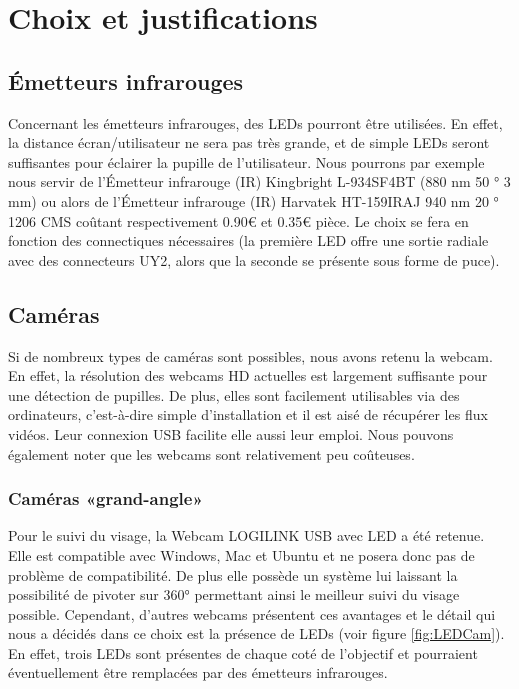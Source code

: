 \chapter{Choix et justifications}

\section{Émetteurs infrarouges}

Concernant les émetteurs infrarouges, des LEDs pourront être utilisées. En effet, la distance écran/utilisateur ne sera pas très grande, et de simple LEDs seront suffisantes pour éclairer la pupille de l'utilisateur. Nous pourrons par exemple nous servir de l’Émetteur infrarouge (IR) Kingbright L-934SF4BT (880 nm 50 ° 3 mm) ou alors de l’Émetteur infrarouge (IR) Harvatek HT-159IRAJ 940 nm 20 ° 1206 CMS coûtant respectivement 0.90€ et 0.35€ pièce. Le choix se fera en fonction des connectiques nécessaires (la première LED offre une sortie radiale avec des connecteurs UY2, alors que la seconde se présente sous forme de puce).

\section{Caméras}

Si de nombreux types de caméras sont possibles, nous avons retenu la webcam. En effet, la résolution des webcams HD actuelles est largement suffisante pour une détection de pupilles. De plus, elles sont facilement utilisables via des ordinateurs, c'est-à-dire simple d'installation et il est aisé de récupérer les flux vidéos. Leur connexion USB facilite elle aussi leur emploi. Nous pouvons également noter que les webcams sont relativement peu coûteuses.


\subsection{Caméras «grand-angle»}

Pour le suivi du visage, la Webcam LOGILINK USB avec LED a été retenue. Elle est compatible avec Windows, Mac et Ubuntu et ne posera donc pas de problème de compatibilité. De plus elle possède un système lui laissant la possibilité de pivoter sur 360° permettant ainsi le meilleur suivi du visage possible. Cependant, d'autres webcams présentent ces avantages et le détail qui nous a décidés dans ce choix est la présence de LEDs (voir figure \ref{fig:LEDCam}). En effet, trois LEDs sont présentes de chaque coté de l'objectif et pourraient éventuellement être remplacées par des émetteurs infrarouges.


